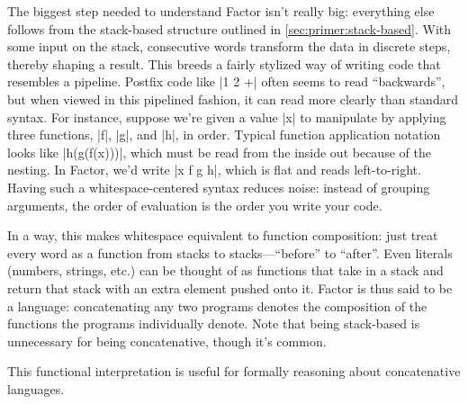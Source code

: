 The biggest step needed to understand Factor isn't really big: everything else
follows from the stack-based structure outlined in
\ref{sec:primer:stack-based}.  With some input on the stack, consecutive words
transform the data in discrete steps, thereby shaping a result.  This breeds a
fairly stylized way of writing code that resembles a pipeline.  Postfix code
like \inlinecode|1 2 +| often seems to read ``backwards'', but when viewed in
this pipelined fashion, it can read more clearly than standard syntax.  For
instance, suppose we're given a value \inlinecode|x| to manipulate by applying
three functions, \inlinecode|f|, \inlinecode|g|, and \inlinecode|h|, in order.
Typical function application notation looks like \inlinecode|h(g(f(x)))|, which
must be read from the inside out because of the nesting.  In Factor, we'd write
\inlinecode|x f g h|, which is flat and reads left-to-right.  Having such a
whitespace-centered syntax reduces noise: instead of grouping arguments, the
order of evaluation is the order you write your code.

In a way, this makes whitespace equivalent to function composition: just treat
every word as a function from stacks to stacks---``before'' to ``after''.  Even
literals (numbers, strings, etc.) can be thought of as functions that take in a
stack and return that stack with an extra element pushed onto it.  Factor is
thus said to be a  language: concatenating any two programs
denotes the composition of the functions the programs individually
denote.  Note that being stack-based is
unnecessary for being concatenative, though it's common.

This functional interpretation is useful for formally reasoning about
concatenative languages.  %


